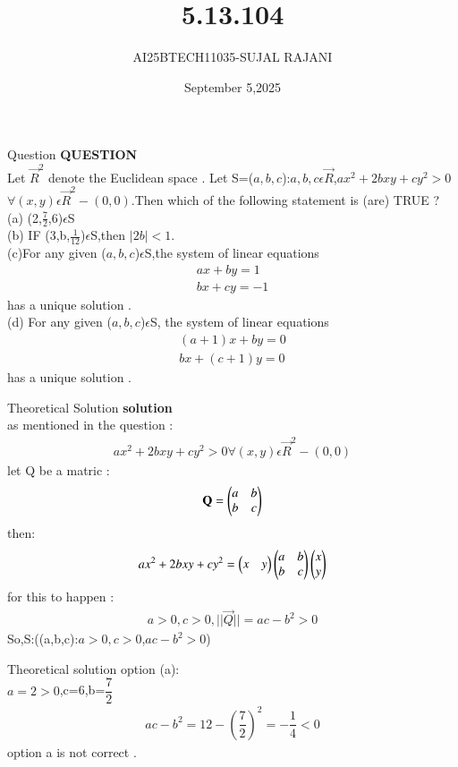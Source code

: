 \documentclass{beamer}
\title %
{5.13.104}
\date{September 5,2025}
\author %
{AI25BTECH11035-SUJAL RAJANI}
\begin{document}
\frame{\titlepage}
\begin{frame}{Question}
\textbf{QUESTION}
\\
Let $\vec{R}^2$ denote the Euclidean space . Let S={($a,b,c$):$a,b,c$$\epsilon$$\vec{R}$,$ax^2+2bxy+cy^2>0$$\forall(x,y)\epsilon\vec{R}^2-{(0,0)}$}.Then which of the following statement is (are) TRUE ?
\\
  (a) (2,$\frac{7}{2}$,6)$\epsilon$S
  \\
  (b) IF (3,b,$\frac{1}{12}$)$\epsilon$S,then $|2b|<1 $.
  \\
  (c)For any given ($a,b,c$)$\epsilon$S,the system of linear equations 
  \begin{align*}
      ax+by=1
      \\
      bx+cy=-1
  \end{align*}
  has a unique solution .
  \\
  (d) For any given ($a,b,c$)$\epsilon$S, the system of linear equations 
  \begin{align*}
      (a+1)x+by=0
      \\
      bx+(c+1)y=0
  \end{align*}
  has a unique solution .
\end{frame}

\begin{frame}{Theoretical Solution}
\textbf{solution}
\\
as mentioned in the question :
\\
\begin{align*}
    ax^2+2bxy+cy^2>0\forall(x,y)\epsilon\vec{R}^2-{(0,0)}
\end{align*}
let Q be a matric :
\begin{align*}
    \mathbf{Q}=\begin{pmatrix}a&b\\b&c\end{pmatrix}
\end{align*}
then:
\begin{align*}
    ax^2+2bxy+cy^2=\begin{pmatrix}x&y\end{pmatrix}\begin{pmatrix}a&b\\b&c\end{pmatrix}\begin{pmatrix}x\\y\end{pmatrix}
\end{align*}
for this to happen :
\\
\begin{align*}
    a>0,c>0,||\vec{Q}||=ac-b^2>0 
\end{align*}
So,S:({(a,b,c):$a>0,c>0$,$ac-b^2>0$})
\end{frame}
\begin{frame}{Theoretical solution}
option (a):
\\
$a=2>0$,c=6,b=$\dfrac{7}{2}$
\\
\begin{align*}
    ac-b^2=12-(\dfrac{7}{2})^2=-\dfrac{1}{4}<0
\end{align*}
option a is not correct .
\end{frame}
\end{document}
